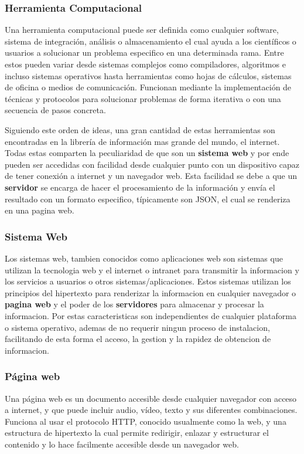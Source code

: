 \subsubsection{Herramienta Computacional}


Una herramienta computacional puede ser definida como cualquier software,
sistema de integración, análisis o almacenamiento el cual ayuda a los científicos
o usuarios a solucionar un problema especifico en una determinada rama. Entre
estos pueden variar desde sistemas complejos como compiladores, algoritmos
e incluso sistemas operativos hasta herramientas como hojas de cálculos, sistemas
de oficina o medios de comunicación. Funcionan mediante la implementación de
técnicas y protocolos para solucionar problemas de forma iterativa o con una
secuencia de pasos concreta.

Siguiendo este orden de ideas, una gran cantidad de estas herramientas son
encontradas en la librería de información mas grande del mundo, el internet.
Todas estas comparten la peculiaridad de que son un \textbf{sistema web} y por
ende pueden
ser accedidas con facilidad desde cualquier punto con un dispositivo capaz de
tener conexión a internet y un navegador web. Esta facilidad se debe a que un
\textbf{servidor} se encarga de hacer el procesamiento de la información y envía
el resultado con un formato especifico, típicamente son  JSON, el cual se renderiza
en una pagina web.

\subsubsection{Sistema Web}

Los sistemas web, tambien conocidos como aplicaciones web son sistemas que
utilizan la tecnologia web y el internet o intranet para transmitir la
informacion y los
servicios a usuarios o otros sistemas/aplicaciones. Estos sistemas utilizan los
principios del hipertexto para renderizar la informacion en cualquier
navegador o \textbf{pagina web} y el poder de los \textbf{servidores} para
almacenar y procesar la informacion. Por estas caracteristicas son independientes
de cualquier plataforma o sistema operativo, ademas de  no requerir ningun
proceso de instalacion, facilitando de esta forma el acceso, la gestion y la
rapidez de obtencion de informacion.



\subsubsection*{Página web}
Una página web es un documento accesible desde cualquier navegador con acceso
a internet, y que puede incluir audio, vídeo, texto y sus diferentes
combinaciones.
Funciona al usar el protocolo HTTP, conocido usualmente como la web, y una
estructura de hipertexto la cual permite redirigir, enlazar y estructurar el
contenido y lo hace facilmente accesible desde un navegador web.

